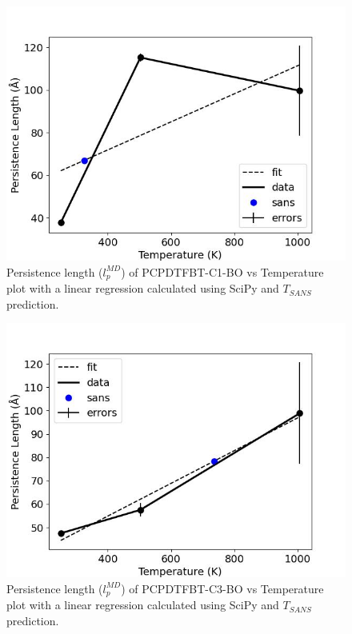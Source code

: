 \begin{figure}
    \centering
    \includegraphics[width=1\linewidth]{src/figures/pers_l_figs/untitled folder/pcpdtfbt/C1_plot.jpeg}
    \caption{Persistence length ($l_p^{MD}$) of PCPDTFBT-C1-BO vs Temperature plot with a linear regression calculated using SciPy \citep{2020SciPy-NMeth} and $T_{SANS}$ prediction.}
    \label{fig:C1_plot}
\end{figure}

\begin{figure}
    \centering
    \includegraphics[width=1\linewidth]{src/figures/pers_l_figs/untitled folder/pcpdtfbt/C3_plot.jpeg}
    \caption{Persistence length ($l_p^{MD}$) of PCPDTFBT-C3-BO vs Temperature plot with a linear regression calculated using SciPy \citep{2020SciPy-NMeth} and $T_{SANS}$ prediction.}
    \label{fig:C3_plot}
\end{figure}

